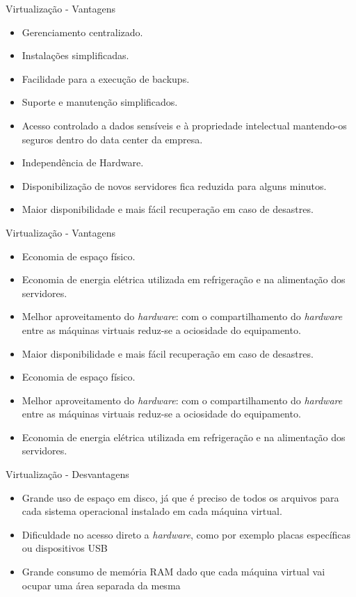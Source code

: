 \documentclass{beamer}
\begin{document}
\begin{frame}{Virtualização - Vantagens}
\begin{itemize}
\item Gerenciamento centralizado.
\item Instalações simplificadas.
\item Facilidade para a execução de backups.
\item Suporte e manutenção simplificados.
\item Acesso controlado a dados sensíveis e à propriedade intelectual mantendo-os seguros dentro do data center da empresa.
\item Independência de Hardware.
\item Disponibilização de novos servidores fica reduzida para alguns minutos.
\item Maior disponibilidade e mais fácil recuperação em caso de desastres.

\end{itemize}
\end{frame}
\begin{frame}{Virtualização - Vantagens}
\begin{itemize}
\item Economia de espaço físico.
\item Economia de energia elétrica utilizada em refrigeração e na alimentação dos servidores.
\item Melhor aproveitamento do {\it hardware}: com o compartilhamento do {\it hardware} entre as máquinas virtuais reduz-se a ociosidade
do equipamento.
\item Maior disponibilidade e mais fácil recuperação em caso de desastres.
\item Economia de espaço físico.
\item Melhor aproveitamento do {\it hardware}: com o compartilhamento do  {\it hardware} entre as máquinas virtuais reduz-se a ociosidade
do equipamento.
\item Economia de energia elétrica utilizada em refrigeração e na alimentação dos servidores.
\end{itemize}
\end{frame}

\begin{frame}{Virtualização - Desvantagens}
\begin{itemize}
\item Grande uso de espaço em disco, já que é preciso de todos os arquivos para cada sistema operacional instalado em cada máquina
virtual.
\item Dificuldade no acesso direto a {\it hardware}, como por exemplo placas específicas ou dispositivos USB
\item Grande consumo de memória RAM dado que cada máquina virtual vai ocupar uma área separada da mesma
\end{itemize}
\end{frame}
\end{document}
